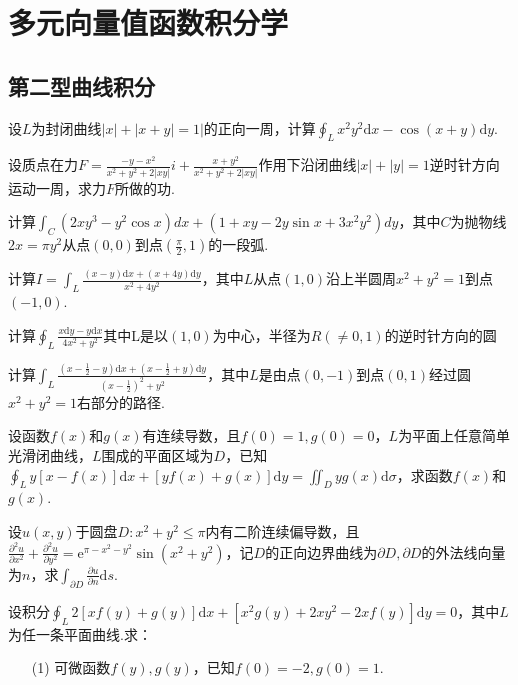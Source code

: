 \chapter{多元向量值函数积分学}\label{cha:6}
\section{第二型曲线积分}
\begin{xiti}
	\item 设$L$为封闭曲线$|x|+|x+y|=1 |$的正向一周，计算$\oint_{L} x^{2} y^{2} \mathrm{d} x-\cos (x+y) \mathrm{d} y$.
	\item 设质点在力$F=\frac{-y-x^{2}}{x^{2}+y^{2}+2|x y|} i+\frac{x+y^{2}}{x^{2}+y^{2}+2|x y|}$作用下沿闭曲线$|x|+|y|=1$逆时针方向运动一周，求力$F$所做的功.
	\item 计算$\int_{C}\left(2 x y^{3}-y^{2} \cos x\right) d x+\left(1+x y-2 y \sin x+3 x^{2} y^{2}\right) d y$，其中$C$为抛物线$2 x=\pi y^{2}$从点$(0,0)$到点$(\frac{\pi}{2},1)$的一段弧.
	\item 计算$I=\int_{L} \frac{(x-y) \mathrm{d} x+(x+4 y) \mathrm{d} y}{x^{2}+4 y^{2}}$，其中$L$从点$(1,0)$沿上半圆周$x^{2}+y^{2}=1$到点$(-1,0)$.
	
	\item 计算$\oint_{L} \frac{x \mathrm{d} y-y \mathrm{d} x}{4 x^{2}+y^{2}}$其中L是以$(1,0)$为中心，半径为$R( \neq 0,1)$的逆时针方向的圆
	\item 计算$\int_{L} \frac{\left(x-\frac{1}{2}-y\right) \mathrm{d} x+\left(x-\frac{1}{2}+y\right) \mathrm{d} y}{\left(x-\frac{1}{2}\right)^{2}+y^{2}}$，其中$L$是由点$(0,-1)$到点$(0,1)$经过圆$x^{2}+y^{2}=1$右部分的路径.
	
	\item 设函数$f(x)$和$g(x)$有连续导数，且$f(0)=1,g(0)=0$，$L$为平面上任意简单光滑闭曲线，$L$围成的平面区域为$D$，已知$\oint_{L} y[x-f(x)] \mathrm{d} x+[y f(x)+g(x)] \mathrm{d} y=\iint_{D} y g(x) \mathrm{d} \sigma$，求函数$f(x)$和$g(x)$.
	\item 设$u(x,y)$于圆盘$D : x^{2}+y^{2} \leqslant \pi$内有二阶连续偏导数，且$\frac{\partial^{2} u}{\partial x^{2}}+\frac{\partial^{2} u}{\partial y^{2}}=\mathrm{e}^{\pi-x^{2}-y^{2}} \sin \left(x^{2}+y^{2}\right)$，记$D$的正向边界曲线为$\partial D, \partial D$的外法线向量为$n$，求$\int_{\partial D} \frac{\partial u}{\partial n} \mathrm{d} s$.
	
	\item 设积分$\oint_{L} 2[x f(y)+g(y)] \mathrm{d} x+\left[x^{2} g(y)+2 x y^{2}-2 x f(y)\right] \mathrm{d} y=0$，其中$L$为任一条平面曲线.求：
	\begin{enumerate}
		\item [(1)] 可微函数$f(y),g(y)$，已知$f(0)=-2, g(0)=1$.
		

\end{enumerate}
\end{xiti}
